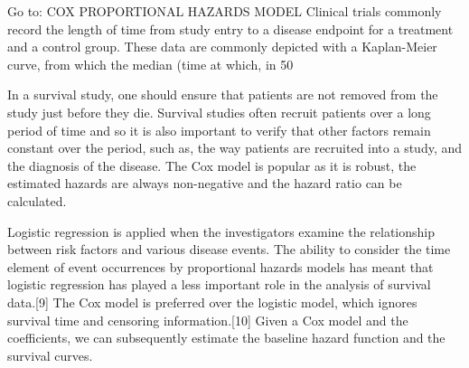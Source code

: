 Go to:
COX PROPORTIONAL HAZARDS MODEL
Clinical trials commonly record the length of time from study entry to a disease endpoint for a treatment and a control group. These data are commonly depicted with a Kaplan-Meier curve, from which the median (time at which, in 50%

In a survival study, one should ensure that patients are not removed from the study just before they die. Survival studies often recruit patients over a long period of time and so it is also important to verify that other factors remain constant over the period, such as, the way patients are recruited into a study, and the diagnosis of the disease. The Cox model is popular as it is robust, the estimated hazards are always non-negative and the hazard ratio can be calculated.

Logistic regression is applied when the investigators examine the relationship between risk factors and various disease events. The ability to consider the time element of event occurrences by proportional hazards models has meant that logistic regression has played a less important role in the analysis of survival data.[9] The Cox model is preferred over the logistic model, which ignores survival time and censoring information.[10] Given a Cox model and the coefficients, we can subsequently estimate the baseline hazard function and the survival curves.

